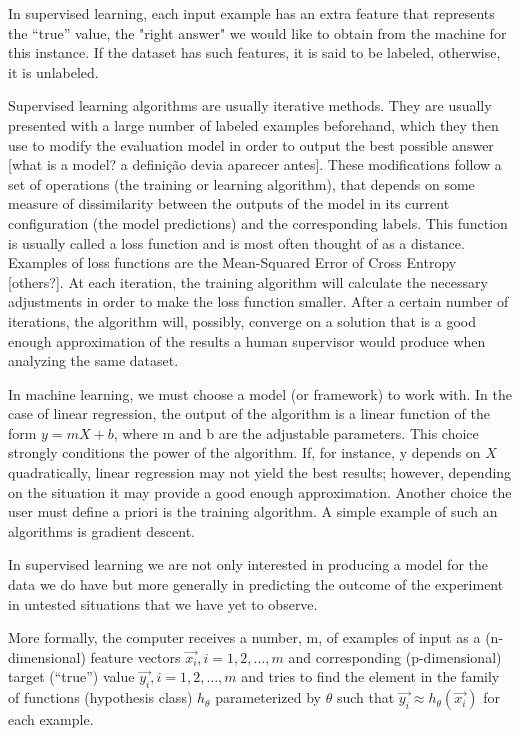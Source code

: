 In supervised learning, each input example has an extra feature that represents the “true” value, the "right answer" we would like to obtain from the machine for this instance. If the dataset has such features, it is said to be labeled, otherwise, it is unlabeled.

Supervised learning algorithms are usually iterative methods. They are usually presented with a large number of labeled examples beforehand, which they then use to modify the evaluation model in order to output the best possible answer [what is a model? a definição devia aparecer antes]. These modifications follow a set of operations (the training or learning algorithm), that depends on some measure of dissimilarity between the outputs of the model in its current configuration (the model predictions) and the corresponding labels. This function is usually called a loss function and is most often thought of as a distance. Examples of loss functions are the Mean-Squared Error of Cross Entropy [others?]. At each iteration, the training algorithm will calculate the necessary adjustments in order to make the loss function smaller. After a certain number of iterations, the algorithm will, possibly, converge on a solution that is a good enough approximation of the results a human supervisor would produce when analyzing the same dataset.

In machine learning, we must choose a model (or framework) to work with. In the case of linear regression, the output of the algorithm is a linear function of the form $y = mX + b$, where m and b are the adjustable parameters. This choice strongly conditions the power of the algorithm. If, for instance, y depends on $X$ quadratically, linear regression may not yield the best results; however, depending on the situation it may provide a good enough approximation.
Another choice the user must define a priori is the training algorithm. A simple example of such an algorithms is gradient descent. 

In supervised learning we are not only interested in producing a model for the data we do have but more generally in predicting the outcome of the experiment in untested situations that we have yet to observe.

More formally, the computer receives a number, m, of examples of input as a (n-dimensional) feature vectors $\vec{x_i}, i = 1,2, \ldots ,m$ and corresponding (p-dimensional) target (“true”) value $\vec{ y_i}, i=1,2, \ldots ,m$ and tries to find the element in the family of functions (hypothesis class) $h_{\theta}$ parameterized by $\theta$ such that $\vec{ y_i}  \approx h_\theta \left(\vec {x_i} \right)$ for each example. 

